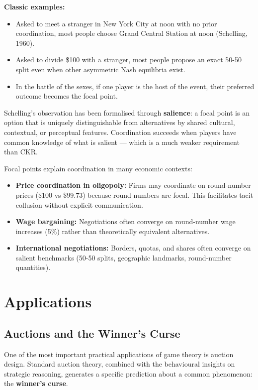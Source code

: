\documentclass[12pt, letterpaper]{article}
\begin{document}
\textbf{Classic examples:}
\begin{itemize}
\item Asked to meet a stranger in New York City at noon with no prior coordination, most people choose Grand Central Station at noon (Schelling, 1960).
\item Asked to divide \$100 with a stranger, most people propose an exact 50-50 split even when other asymmetric Nash equilibria exist.
\item In the battle of the sexes, if one player is the host of the event, their preferred outcome becomes the focal point.
\end{itemize}

Schelling's observation has been formalised through \textbf{salience}: a focal point is an option that is uniquely distinguishable from alternatives by shared cultural, contextual, or perceptual features. Coordination succeeds when players have common knowledge of what is salient --- which is a much weaker requirement than CKR.

Focal points explain coordination in many economic contexts:
\begin{itemize}
\item \textbf{Price coordination in oligopoly:} Firms may coordinate on round-number prices (\$100 vs \$99.73) because round numbers are focal. This facilitates tacit collusion without explicit communication.
\item \textbf{Wage bargaining:} Negotiations often converge on round-number wage increases (5\%) rather than theoretically equivalent alternatives.
\item \textbf{International negotiations:} Borders, quotas, and shares often converge on salient benchmarks (50-50 splits, geographic landmarks, round-number quantities).
\end{itemize}

\medskip


\section{Applications}



\subsection{Auctions and the Winner's Curse}


One of the most important practical applications of game theory is auction design. Standard auction theory, combined with the behavioural insights on strategic reasoning, generates a specific prediction about a common phenomenon: the \textbf{winner's curse}.
\end{document}

